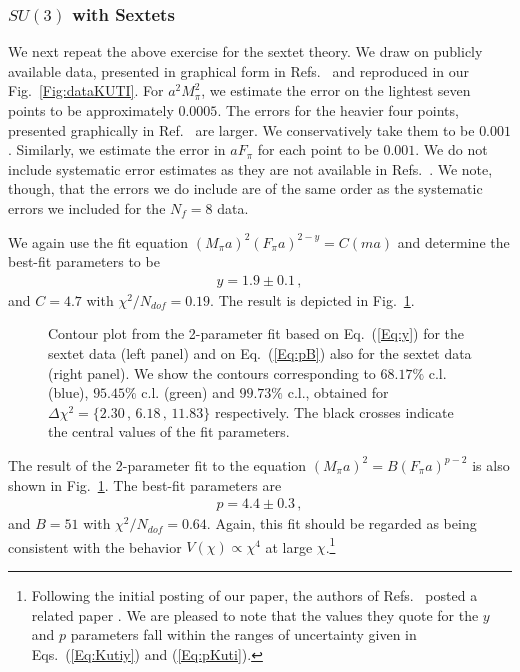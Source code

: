 \documentclass[a4paper,11pt]{article}
\newcommand{\beqs}{\begin{eqnarray}}
\newcommand{\eeqs}{\end{eqnarray}}
\begin{document}
\subsubsection{$SU(3)$ with Sextets}
\label{Sec:SU3}

We next repeat the above exercise for the sextet theory. We draw on publicly available data, presented in graphical form in Refs.~\cite{FHKMNW,FHKMNW2,FHKNSW} and reproduced in our Fig.~\ref{Fig:dataKUTI}. For $a^2M_{\pi}^2$, we estimate the error on the lightest seven points to be approximately $0.0005$. The errors for the heavier four points, presented graphically in Ref.~\cite{FHKNSW} are larger. We conservatively take them to be $0.001$. Similarly, we estimate the error in $aF_{\pi}$ for each point to be $0.001$. We do not include systematic error estimates as they are not available in Refs.~\cite{FHKMNW,FHKMNW2,FHKNSW}. We note, though, that the errors we do include are of the same order as the systematic errors we included for the $N_f=8$ data. 

We again use the fit equation $(M_{\pi}a)^2 (F_{\pi}a)^{2-y} = C (ma)$ and determine the best-fit parameters to be
\beqs
y = 1.9\pm0.1\,,
\label{Eq:Kutiy}
\eeqs
and $C=4.7$ with $\chi^2/N_{dof}=0.19$. The result is depicted in Fig.~\ref{Fig:yAKUTI}.

\begin{figure}[h]
\begin{center}
\qquad
{} 
\caption{Contour plot from the 2-parameter fit based on Eq.~(\ref{Eq:y}) for the sextet data (left panel) and on Eq.~(\ref{Eq:pB}) also for the sextet data (right panel). We show the contours corresponding to $68.17\%$ c.l. (blue), $95.45\%$ c.l. (green) and $99.73\%$ c.l.,
obtained for $\Delta \chi^2=\{2.30\,,\,6.18\,,\,11.83\}$ respectively. The black crosses indicate the central values of the fit parameters.}
\label{Fig:yAKUTI}
\end{center}
\end{figure}

The result of the 2-parameter fit to the equation $(M_{\pi}a)^2 = B(F_{\pi}a)^{p-2}$ is also shown in Fig.~\ref{Fig:yAKUTI}. The best-fit parameters are 
\beqs
p=4.4\pm0.3\, ,
\label{Eq:pKuti}
\eeqs
 and $B=51$ with $\chi^2/N_{dof}=0.64$. Again, this fit should be regarded as being consistent with the behavior $V(\chi)\propto\chi^4$ at large $\chi$.\footnote{Following the initial posting of our paper, the authors of Refs.~\cite{FHKMNW,FHKMNW2,FHKNSW} posted a related paper \cite{Fodor:2017nlp}. We are pleased to note that the values they quote for the $y$ and $p$ parameters fall within the ranges of uncertainty given in Eqs.~(\ref{Eq:Kutiy}) and (\ref{Eq:pKuti}).}
\bigskip
\end{document}
